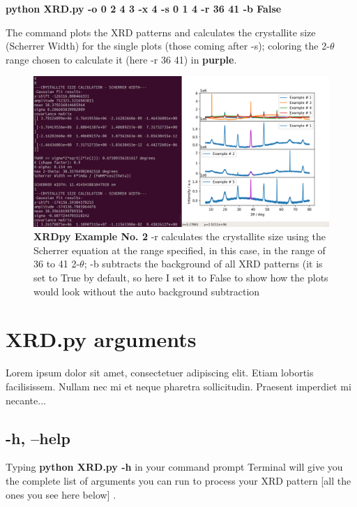 \documentclass{article}
\begin{document}
\begin{description}


\item \textbf{python XRD.py -o 0 2 4 3 -x 4 -s 0 1 4 -r 36 41 -b False}  

The command plots the XRD patterns and calculates the crystallite size (Scherrer Width) for the single plots (those coming after -s); coloring the 2-$\theta$ range chosen to calculate it (here -r 36 41) in \textbf{\textcolor{byzantine}{purple}}.

\begin{figure}[htbp]
\centerline{\includegraphics[scale=.2]{example-2.png}}
\caption {\textbf{XRDpy Example No. 2} -r calculates the crystallite size using the Scherrer equation at the range specified, in this case, in the range of 36 to 41 2-$\theta$; -b subtracts the background of all XRD patterns (it is set to True by default, so here I set it to False to show how the plots would look without the auto background subtraction}
\label{fig7}
\end{figure}


\end{description}

\pagebreak

\section{XRD.py arguments}

Lorem ipsum dolor sit amet, consectetuer adipiscing elit.  
Etiam lobortis facilisissem.  Nullam nec mi et neque pharetra 
sollicitudin.  Praesent imperdiet mi necante...

\subsection{-h, --help} 

Typing \textbf{python XRD.py -h} in your command prompt Terminal will give you the complete list of arguments you can run to process your XRD pattern [all the ones you see here below] . 
\end{document}
